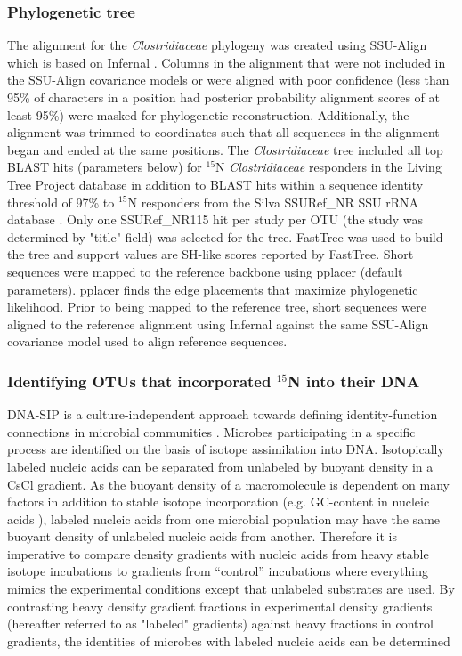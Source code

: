 \subsubsection{Phylogenetic tree}
The alignment for the \textit{Clostridiaceae} phylogeny was created using
SSU-Align which is based on Infernal \citep{24008419, 19307242}. Columns in the
alignment that were not included in the SSU-Align covariance models or were
aligned with poor confidence (less than 95\% of characters in a position had
posterior probability alignment scores of at least 95\%) were masked for
phylogenetic reconstruction. Additionally, the alignment was trimmed to
coordinates such that all sequences in the alignment began and ended at the
same positions. The \textit{Clostridiaceae} tree included all top BLAST hits
(parameters below) for $^{15}$N \textit{Clostridiaceae} responders in the
Living Tree Project database \citep{Yarza_2008} in addition to BLAST hits
within a sequence identity threshold of 97\% to $^{15}$N responders from the
Silva SSURef\_NR SSU rRNA database \citep{17947321}. Only one SSURef\_NR115 hit
per study per OTU (the study was determined by "title" field) was selected for
the tree. FastTree \citep{20224823} was used to build the tree and support
values are SH-like scores reported by FastTree. Short sequences were mapped to
the reference backbone using pplacer \citep{Matsen_2010} (default parameters).
pplacer finds the edge placements that maximize phylogenetic likelihood. Prior
to being mapped to the reference tree, short sequences were aligned to the
reference alignment using Infernal \citep{19307242} against the same SSU-Align
covariance model used to align reference sequences.

\subsubsection{Identifying OTUs that incorporated $^{15}$N into their DNA}
DNA-SIP is a culture-independent approach towards defining identity-function
connections in microbial communities \citep{Buckley_2011, 17446886,
Radajewski_2001}.
Microbes participating in a specific process are identified on the basis of
isotope assimilation into DNA. Isotopically labeled nucleic acids can be
separated from unlabeled by buoyant density in a CsCl gradient. As the buoyant
density of a macromolecule is dependent on many factors in addition to stable
isotope incorporation (e.g. GC-content in nucleic acids \citep{25139123}),
labeled nucleic acids from one microbial population may have the same buoyant
density of unlabeled nucleic acids from another.  Therefore it is imperative to
compare density gradients with nucleic acids from heavy stable isotope
incubations to gradients from ``control'' incubations where everything mimics
the experimental conditions except that unlabeled substrates are used. By
contrasting heavy density gradient fractions in experimental density gradients
(hereafter referred to as "labeled" gradients) against heavy fractions in
control gradients, the identities of microbes with labeled nucleic acids can be
determined 

